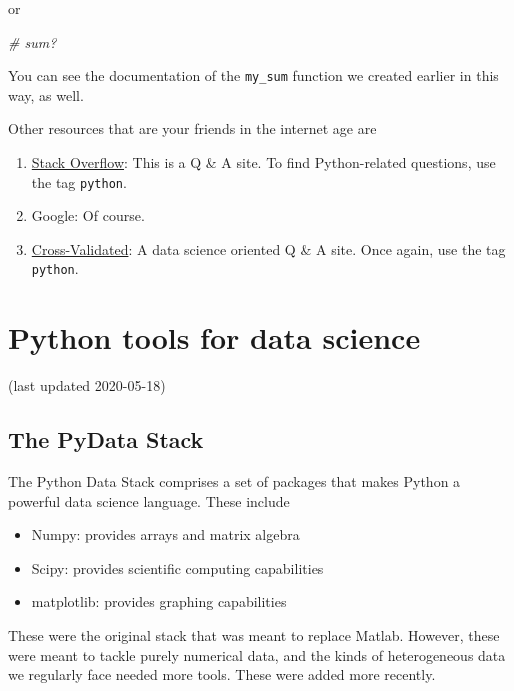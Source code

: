 \documentclass[
  letterpaper,
]{scrbook}
\newenvironment{Shaded}{\begin{snugshade}}{\end{snugshade}}
\newcommand{\CommentTok}[1]{\textcolor[rgb]{0.56,0.35,0.01}{\textit{#1}}}
\providecommand{\tightlist}{%
  \setlength{\itemsep}{0pt}\setlength{\parskip}{0pt}}
\begin{document}
or

\begin{Shaded}
\begin{Highlighting}[]
\CommentTok{# sum?}
\end{Highlighting}
\end{Shaded}

You can see the documentation of the \texttt{my\_sum} function we created earlier in this way, as well.

Other resources that are your friends in the internet age are

\begin{enumerate}
\def\labelenumi{\arabic{enumi}.}
\tightlist
\item
  \href{https://stackoverflow.com}{Stack Overflow}: This is a Q \& A site. To find Python-related questions, use the tag \texttt{python}.
\item
  Google: Of course.
\item
  \href{https://stats.stackexchange.com}{Cross-Validated}: A data science oriented Q \& A site. Once again, use the tag \texttt{python}.
\end{enumerate}

\hypertarget{python-tools-for-data-science}{%
\chapter{Python tools for data science}\label{python-tools-for-data-science}}

(last updated 2020-05-18)

\hypertarget{the-pydata-stack}{%
\section{The PyData Stack}\label{the-pydata-stack}}

The Python Data Stack comprises a set of packages that makes Python a powerful data science language. These include

\begin{itemize}
\tightlist
\item
  Numpy: provides arrays and matrix algebra
\item
  Scipy: provides scientific computing capabilities
\item
  matplotlib: provides graphing capabilities
\end{itemize}

These were the original stack that was meant to replace Matlab. However, these were meant to tackle purely numerical data, and the kinds of heterogeneous data we regularly face needed more tools. These were added more recently.
\end{document}
